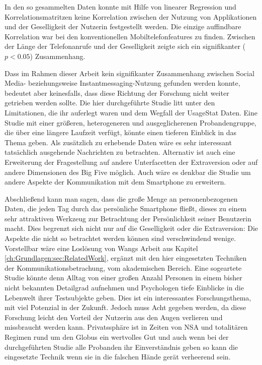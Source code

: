 \par
In den so gesammelten Daten konnte mit Hilfe von linearer Regression und Korrelationsmatritzen keine Korrelation zwischen der Nutzung von Applikationen und der Geselligkeit der Nutzerin festgestellt werden. 
Die einzige auffindbare Korrelation war bei den konventionellen Mobiltelefonfeatures zu finden.
Zwischen der Länge der Telefonanrufe und der Geselligkeit zeigte sich ein signifikanter ($p < 0.05$) Zusammenhang.
\par
Dass im Rahmen dieser Arbeit kein signifikanter Zusammenhang zwischen Social Media- beziehungsweise Instantmessaging-Nutzung gefunden werden konnte, bedeutet aber keinesfalls,
dass diese Richtung der Forschung nicht weiter getrieben werden sollte.
Die hier durchgeführte Studie litt unter den Limitationen, die ihr auferlegt waren und dem Wegfall der UsageStat Daten.
Eine Studie mit einer größeren, heterogeneren und ausgeglicherenen Probandengruppe, die über eine längere Laufzeit verfügt, könnte einen tieferen Einblick in das Thema geben.
Als zusätzlich zu erhebende Daten wäre es sehr interessant tatsächlich ausgehende Nachrichten zu betrachten.
Alternativ ist auch eine Erweiterung der Fragestellung auf andere Unterfacetten der Extraversion oder auf andere Dimensionen des Big Five möglich.
Auch wäre es denkbar die Studie um andere Aspekte der Kommunikation mit dem Smartphone zu erweitern.
\par
Abschließend kann man sagen, dass die große Menge an personenbezogenen Daten,
die jeden Tag durch das persönliche Smartphone fließt, dieses zu einem sehr attraktiven Werkzeug zur Betrachtung der Persönlichkeit seiner Benutzerin macht.
Dies begrenzt sich nicht nur auf die Geselligkeit oder die Extraversion: 
Die Aspekte die nicht so betrachtet werden können sind verschwindend wenige.
Vorstellbar wäre eine Loslösung von Wangs Arbeit aus Kapitel \ref{ch:Grundlagen:sec:RelatedWork}, ergänzt mit den hier eingesetzten Techniken der Kommunikationsbetrachung, vom akademischen Bereich.
Eine sogeartete Studie könnte denn Alltag von einer großen Anzahl Personen in einem bisher nicht bekannten Detailgrad aufnehmen und Psychologen tiefe Einblicke in die Lebenwelt ihrer Testsubjekte geben.
Dies ist ein interessantes Forschungsthema, mit viel Potenzial in der Zukunft.
Jedoch muss Acht gegeben werden, da
diese Forschung leicht den Vorteil der Nutzerin aus den Augen verlieren und missbraucht werden kann. 
Privatssphäre ist in Zeiten von NSA und totalitären Regimen rund um den Globus ein wertvolles Gut und auch wenn bei der durchgeführten Studie alle Probanden ihr Einverständnis geben so kann die eingesetzte Technik wenn sie in die falschen Hände gerät verheerend sein.


